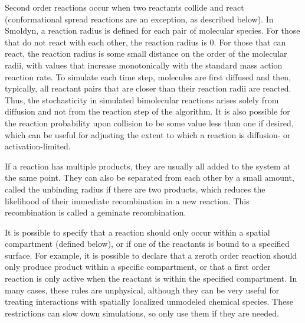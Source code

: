 \documentclass {scrbook}
\begin{document}
Second order reactions occur when two reactants collide and react (conformational spread reactions are an exception, as described below). In Smoldyn, a reaction radius is defined for each pair of molecular species. For those that do not react with each other, the reaction radius is 0. For those that can react, the reaction radius is some small distance on the order of the molecular radii, with values that increase monotonically with the standard mass action reaction rate. To simulate each time step, molecules are first diffused and then, typically, all reactant pairs that are closer than their reaction radii are reacted. Thus, the stochasticity in simulated bimolecular reactions arises solely from diffusion and not from the reaction step of the algorithm. It is also possible for the reaction probability upon collision to be some value less than one if desired, which can be useful for adjusting the extent to which a reaction is diffusion- or activation-limited.

If a reaction has multiple products, they are usually all added to the system at the same point. They can also be separated from each other by a small amount, called the unbinding radius if there are two products, which reduces the likelihood of their immediate recombination in a new reaction. This recombination is called a geminate recombination.

It is possible to specify that a reaction should only occur within a spatial compartment (defined below), or if one of the reactants is bound to a specified surface. For example, it is possible to declare that a zeroth order reaction should only produce product within a specific compartment, or that a first order reaction is only active when the reactant is within the specified compartment. In many cases, these rules are unphysical, although they can be very useful for treating interactions with spatially localized unmodeled chemical species. These restrictions can slow down simulations, so only use them if they are needed.
\end{document}
